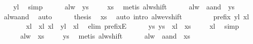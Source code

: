 \begin{isabellebody}
\ {}\ \isamarkupfalse%
\ yl\ \isamarkupfalse%
\ simp\isanewline
\ \ \ \ \isamarkupfalse%
\ {\isachardoublequoteopen}alw\ {\isasymphi}\ ys{}{\isachardoublequoteclose}\ \isamarkupfalse%
\ {\isasymphi}{\isasymphi}\ \isamarkupfalse%
\ xs{}{\isacharprime}\ \isamarkupfalse%
\ {\isacharparenleft}metis\ alw{\isacharunderscore}shift{\isacharparenright}\isanewline
\ \ \ \ \isamarkupfalse%
\ {\isachardoublequoteopen}alw\ {\isacharparenleft}{\isasymphi}\ aand\ {\isasympsi}{\isacharparenright}\ ys{}{\isachardoublequoteclose}\ \isamarkupfalse%
\ {\isasympsi}{\isasympsi}\ \isamarkupfalse%
\ alw{\isacharunderscore}aand\ \isamarkupfalse%
\ auto\isanewline
\ \ \ \ \isamarkupfalse%
\ {\isacharquery}thesis\ \isamarkupfalse%
\ xs{}\ \isamarkupfalse%
\ {\isacharparenleft}auto\ intro{\isacharcolon}\ alw{\isacharunderscore}ev{\isacharunderscore}shift{\isacharparenright}\isanewline
\ \ \isamarkupfalse%
\isanewline
\ \ \ \ \isamarkupfalse%
\ {\isachardoublequoteopen}prefix\ yl\ xl{\isachardoublequoteclose}\isanewline
\ \ \ \ \isamarkupfalse%
\ \isamarkupfalse%
\ xl{}\ \ xl{\isacharcolon}\ {\isachardoublequoteopen}xl\ {\isacharequal}\ yl\ {\isacharat}\ xl{}{\isachardoublequoteclose}\ \isamarkupfalse%
\ {\isacharparenleft}elim\ prefixE{\isacharparenright}\isanewline
\ \ \ \ \isamarkupfalse%
\ ys{}{\isacharprime}{\isacharcolon}\ {\isachardoublequoteopen}ys{}\ {\isacharequal}\ xl{}\ {\isacharat}{\isacharminus}\ xs{}{\isachardoublequoteclose}\ \isamarkupfalse%
\ {}\ \isamarkupfalse%
\ xl\ \isamarkupfalse%
\ simp\isanewline
\ \ \ \ \isamarkupfalse%
\ {\isachardoublequoteopen}alw\ {\isasympsi}\ xs{}{\isachardoublequoteclose}\ \isamarkupfalse%
\ {\isasympsi}{\isasympsi}\ \isamarkupfalse%
\ ys{}{\isacharprime}\ \isamarkupfalse%
\ {\isacharparenleft}metis\ alw{\isacharunderscore}shift{\isacharparenright}\isanewline
\ \ \ \ \isamarkupfalse%
\ {\isachardoublequoteopen}alw\ {\isacharparenleft}{\isasymphi}\ aand\ {\isasympsi}{\isacharparenright}\ xs{}{\isachardoublequoteclose}\ \isamarkupfalse%

\end{isabellebody}
